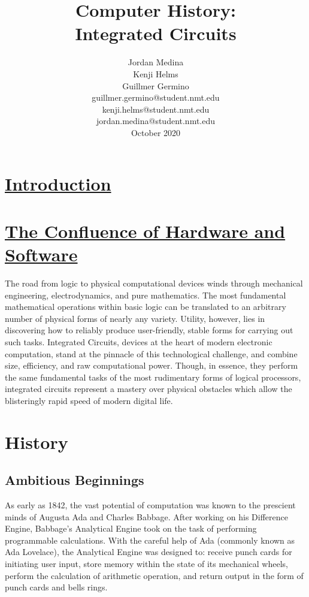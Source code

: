 \documentclass[letterpaper, 10 pt, conference]{IEEEconf}
\title{\LARGE \bf
Computer History:\\Integrated Circuits
}
\author{Jordan Medina\\Kenji Helms\\Guillmer Germino\\
\small guillmer.germino@student.nmt.edu\\
\small kenji.helms@student.nmt.edu\\
\small jordan.medina@student.nmt.edu\\
\small {October 2020}
}
\begin{document}
\maketitle

\section{\underline{Introduction}\\\\
\small {\underline{The Confluence of Hardware and Software}}}
The road from logic to physical computational devices winds through mechanical engineering, electrodynamics, and pure mathematics. The most fundamental mathematical operations within basic logic can be translated to an arbitrary number of physical forms of nearly any  variety. Utility, however, lies in discovering how to reliably produce user-friendly, stable forms for carrying out such tasks. Integrated Circuits, devices at the heart of modern electronic computation, stand at the pinnacle of this technological challenge, and combine size, efficiency, and raw computational power. Though, in essence, they perform the same fundamental tasks of the most rudimentary forms of logical processors, integrated circuits represent a mastery over physical obstacles which allow the blisteringly rapid speed of modern digital life.


\section{History}
\subsection{Ambitious Beginnings}

As early as 1842, the vast potential of computation was known to the prescient minds of Augusta Ada and Charles Babbage. After working on his Difference Engine, Babbage's Analytical Engine took on the task of performing programmable calculations. With the careful help of Ada (commonly known as Ada Lovelace), the Analytical Engine was designed to: receive punch cards for initiating user input, store memory within the state of its mechanical wheels, perform the calculation of arithmetic operation, and return output in the form of punch cards and bells rings. 
\end{document}
